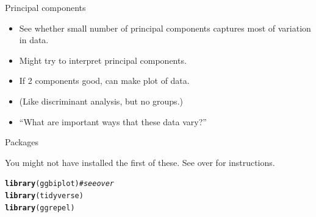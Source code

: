 \documentclass[unknownkeysallowed]{beamer}\usepackage[]{graphicx}\usepackage[]{color}
\makeatletter
\newcommand{\hlcom}[1]{\textcolor[rgb]{0.678,0.584,0.686}{\textit{#1}}}%
\newcommand{\hlstd}[1]{\textcolor[rgb]{0.345,0.345,0.345}{#1}}%
\newcommand{\hlkwd}[1]{\textcolor[rgb]{0.737,0.353,0.396}{\textbf{#1}}}%
\newenvironment{kframe}{%
 \def\at@end@of@kframe{}%
 \ifinner\ifhmode%
  \def\at@end@of@kframe{\end{minipage}}%
  \begin{minipage}{\columnwidth}%
 \fi\fi%
 \def\FrameCommand##1{\hskip\@totalleftmargin \hskip-\fboxsep
 \colorbox{shadecolor}{##1}\hskip-\fboxsep
     \hskip-\linewidth \hskip-\@totalleftmargin \hskip\columnwidth}%
 \MakeFramed {\advance\hsize-\width
   \@totalleftmargin\z@ \linewidth\hsize
   \@setminipage}}%
 {\par\unskip\endMakeFramed%
 \at@end@of@kframe}
\newenvironment{knitrout}{}{} %
\makeatother
\begin{document}
\begin{frame}[fragile]{Principal components}
  
  \begin{itemize}
  \item See whether small number of principal components captures most of variation in data.
  \item Might try to interpret principal components.
  \item If 2 components good, can make plot of data.
  \item (Like discriminant analysis, but no groups.)
  \item ``What are important ways that these data vary?''
  \end{itemize}
  
\end{frame}

\begin{frame}[fragile]{Packages}
  
  


You might not have installed the first of these. See over for
instructions. 

\begin{knitrout}
\color{fgcolor}\begin{kframe}
\begin{alltt}
\hlkwd{library}\hlstd{(ggbiplot)} \hlcom{# see over}
\hlkwd{library}\hlstd{(tidyverse)}
\hlkwd{library}\hlstd{(ggrepel)}
\end{alltt}
\end{kframe}
\end{knitrout}
  
\end{frame}
\end{document}
